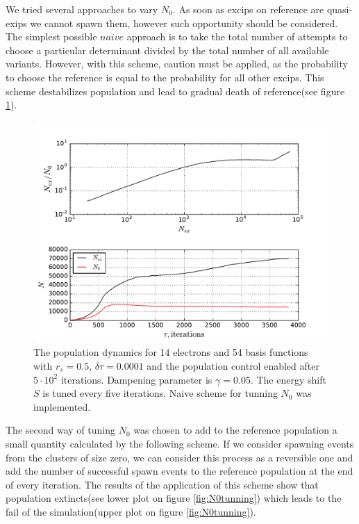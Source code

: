 \documentclass[twoside,english]{uiofysmaster}
\begin{document}
We tried several approaches to vary $N_0$. As soon as excips on reference are quasi-exips we cannot spawn them, however such opportunity should be considered. The simplest possible $naive$ approach is to take the total number of attempts to choose a particular determinant divided by the total number of all available variants. However, with this scheme, caution must be applied, as the probability to choose the reference is equal to the probability for all other excips. This scheme destabilizes population and lead to gradual death of reference(see figure \ref{fig:N0tunningNaive}).


\begin{figure}[ht!]
	\centering
	\includegraphics[width=0.8\linewidth]{N0tunningNaive}
	\caption{The population dynamics for 14 electrons and 54 basis functions with $r_s=0.5$, $\delta \tau=0.0001$ and the population control enabled after $5\cdot 10^2$ iterations. Dampening parameter is $\gamma = 0.05$. The energy shift $S$ is tuned every five iterations. Naive scheme for tunning $N_0$ was implemented.}
	\label{fig:N0tunningNaive}
\end{figure}
The second way of tuning $N_0$ was chosen to add to the reference population a small quantity calculated by the following scheme. If we consider spawning events from the clusters of size zero, we can consider this process as a reversible one and add the number of successful spawn events to the reference population at the end of every iteration. The results of the application of this scheme show that population extincts(see lower plot on figure \ref{fig:N0tunning}) which leads to the fail of the simulation(upper plot on figure \ref{fig:N0tunning}).
\end{document}
